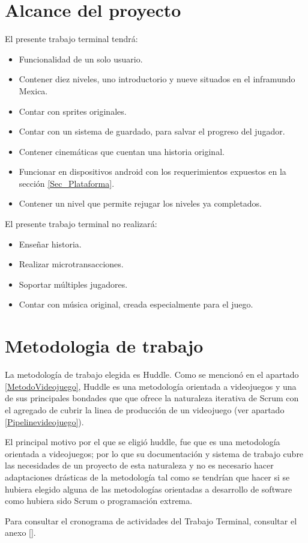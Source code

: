\section{Alcance del proyecto} \label{Sec_Alcance}
	El presente trabajo terminal tendrá:
		\begin{itemize}
			\item Funcionalidad de un solo usuario.
			\item Contener diez niveles, uno introductorio y nueve situados en el inframundo Mexica.
			\item Contar con sprites originales.
			\item Contar con un sistema de guardado, para salvar el progreso del jugador.
			\item Contener cinemáticas que cuentan una historia original.
			\item Funcionar en dispositivos android con los requerimientos expuestos en la sección \ref{Sec_Plataforma}.
			\item Contener un nivel que permite rejugar los niveles ya completados. 
		\end{itemize}
	El presente trabajo terminal no realizará:
	\begin{itemize}
		\item Enseñar historia.
		\item Realizar microtransacciones.
		\item Soportar múltiples jugadores.
		\item Contar con música original, creada especialmente para el juego.
	\end{itemize}
\section{Metodologia de trabajo}\label{Sec_Metodologia}
La metodología de trabajo elegida es Huddle. Como se mencionó en el apartado
 \ref{MetodoVideojuego}, Huddle es una metodología orientada a videojuegos y una
  de sus principales bondades que que ofrece la naturaleza iterativa de Scrum 
  con el agregado de cubrir la linea de producción de un videojuego 
  (ver apartado \ref{Pipelinevideojuego}).
\\
\par
El principal motivo por el que se eligió huddle, fue que es una metodología 
orientada a videojuegos; por lo que su documentación y sistema de trabajo cubre 
las necesidades de un proyecto de esta naturaleza y no es necesario hacer 
adaptaciones drásticas de la metodología tal como se tendrían que hacer si se 
hubiera elegido alguna de las metodologías orientadas a desarrollo de software 
como hubiera sido Scrum o programación extrema. 
\\
\par
Para consultar el cronograma de actividades del Trabajo Terminal, consultar el anexo \ref{}.

